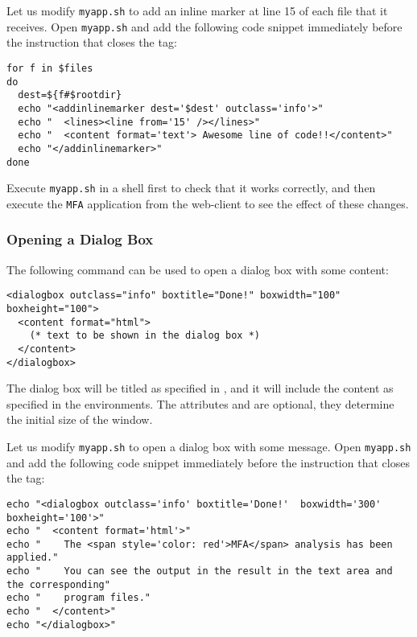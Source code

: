 Let us modify \texttt{myapp.sh} to add an inline marker at line 15 of
each file that it receives. Open \texttt{myapp.sh} and add the
following code snippet immediately before the instruction that closes
the  tag:

\medskip
\begin{lstlisting}[style=script]for f in $files 
do
  dest=${f#$rootdir}
  echo "<addinlinemarker dest='$dest' outclass='info'>"
  echo "  <lines><line from='15' /></lines>"
  echo "  <content format='text'> Awesome line of code!!</content>"
  echo "</addinlinemarker>"
done
\end{lstlisting}

\medskip
\noindent
Execute \texttt{myapp.sh} in a shell first to check that it works
correctly, and then execute the \texttt{MFA} application from the
web-client to see the effect of these changes.


\subsubsection{Opening a Dialog Box}

The following command can be used to open a dialog box with some
content:

\medskip
\begin{lstlisting}
<dialogbox outclass="info" boxtitle="Done!" boxwidth="100" boxheight="100"> 
  <content format="html">
    (* text to be shown in the dialog box *)
  </content>
</dialogbox>
\end{lstlisting}

\medskip 
\noindent 
The dialog box will be titled as specified in , and it
will include the content as specified in the 
environments. The attributes  and  are
optional, they determine the initial size of the window.

Let us modify \texttt{myapp.sh} to open a dialog box with some
message. Open \texttt{myapp.sh} and add the following code snippet
immediately before the instruction that closes the 
tag:

\medskip
\begin{lstlisting}[style=script]
echo "<dialogbox outclass='info' boxtitle='Done!'  boxwidth='300' boxheight='100'>"
echo "  <content format='html'>"
echo "    The <span style='color: red'>MFA</span> analysis has been applied."
echo "    You can see the output in the result in the text area and the corresponding"
echo "    program files."
echo "  </content>"
echo "</dialogbox>"
\end{lstlisting}

